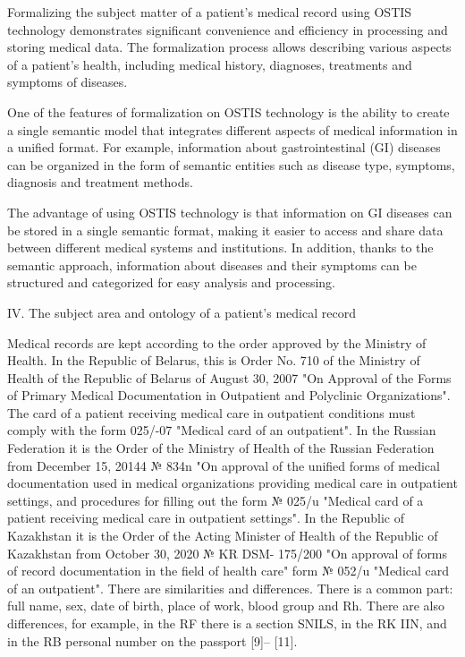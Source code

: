 \documentclass{article}
\begin{document}
\begin{multicols}{2}
\par Formalizing the subject matter of a patient’s medical record using OSTIS technology demonstrates significant convenience and efficiency in processing and storing medical data. The formalization process allows describing various aspects of a patient’s health, including medical history, diagnoses, treatments and symptoms of diseases. \par One of the features of formalization on OSTIS technology is the ability to create a single semantic model that integrates different aspects of medical information in a unified format. For example, information about gastrointestinal (GI) diseases can be organized in the form of semantic entities such as disease type, symptoms, diagnosis and treatment methods.
\par  The advantage of using OSTIS technology is that information on GI diseases can be stored in a single semantic format, making it easier to access and share data between different medical systems and institutions. In addition, thanks to the semantic approach, information about diseases and their symptoms can be structured and categorized for easy analysis and processing. 
\begin{center}
  IV. The subject area and ontology of a patient’s medical record   
\end{center}
\par Medical records are kept according to the order approved by the Ministry of Health. In the Republic of Belarus, this is Order No. 710 of the Ministry of Health of the Republic of Belarus of August 30, 2007 "On Approval of the Forms of Primary Medical Documentation in Outpatient and Polyclinic Organizations". The card of a patient receiving medical care in outpatient conditions must comply with the form 025/-07 "Medical card of an outpatient". In the Russian Federation it is the Order of the Ministry of Health of the Russian Federation from December 15, 20144 № 834n "On approval of the unified forms of medical documentation used in medical organizations providing medical care in outpatient settings, and procedures for filling out the form № 025/u "Medical card of a patient receiving medical care in outpatient settings". In the Republic of Kazakhstan it is the Order of the Acting Minister of Health of the Republic of Kazakhstan from October 30, 2020 № KR DSM- 175/200 "On approval of forms of record documentation in the field of health care" form № 052/u "Medical card of an outpatient". There are similarities and differences. There is a common part: full name, sex, date of birth, place of work, blood group and Rh. There are also differences, for example, in the RF there is a section SNILS, in the RK IIN, and in the RB personal number on the passport [9]– [11]. 

\end{multicols}
\end{document}
